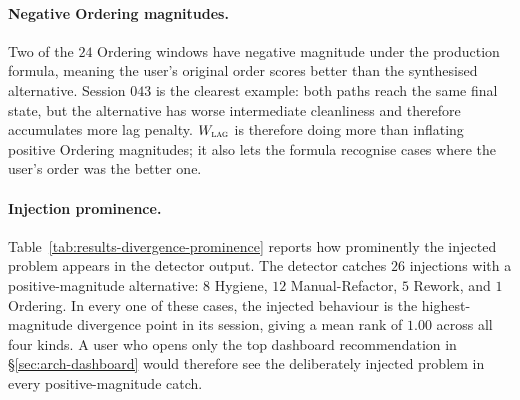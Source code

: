 \begin{table}[htbp]
\centering
\small
{}
\caption{Per-kind detection quality. ``DPs'' gives the number of emitted divergence points. The beats, ties, and loses columns group those points by the sign of $J(\text{alt}_T) - J(\text{user}_T)$ under the production formula. Hygiene improves on the user in every case; Ordering has many ties because several reordered alternatives reach the same final state with the same final score.}
\label{tab:results-divergence-quality}
\end{table}

\paragraph{Negative Ordering magnitudes.}
Two of the $24$ Ordering windows have negative magnitude under the production formula, meaning the user's original order scores better than the synthesised alternative. Session $043$ is the clearest example: both paths reach the same final state, but the alternative has worse intermediate cleanliness and therefore accumulates more lag penalty. $W_{\textsc{lag}}$ is therefore doing more than inflating positive Ordering magnitudes; it also lets the formula recognise cases where the user's order was the better one.

\paragraph{Injection prominence.}
Table~\ref{tab:results-divergence-prominence} reports how prominently the injected problem appears in the detector output. The detector catches $26$ injections with a positive-magnitude alternative: $8$ Hygiene, $12$ Manual-Refactor, $5$ Rework, and $1$ Ordering. In every one of these cases, the injected behaviour is the highest-magnitude divergence point in its session, giving a mean rank of $1.00$ across all four kinds. A user who opens only the top dashboard recommendation in \S\ref{sec:arch-dashboard} would therefore see the deliberately injected problem in every positive-magnitude catch.

